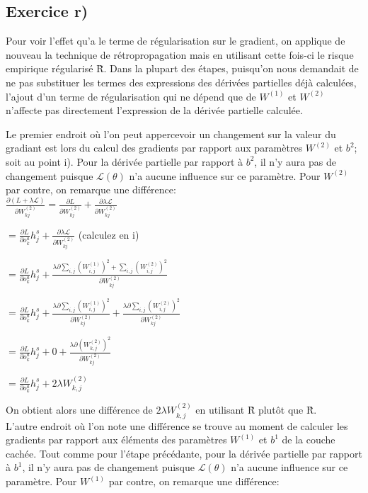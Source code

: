 \documentclass[a4paper,10pt]{article}
\begin{document}
\subsection{Exercice r)}

Pour voir l'effet qu'a le terme de régularisation sur le gradient, on applique de nouveau la technique de rétropropagation mais en utilisant cette fois-ci le risque empirique régularisé \~{R}. Dans la plupart des étapes, puisqu'on nous demandait de ne pas substituer les termes des expressions des dérivées partielles déjà calculées, l'ajout d'un terme de régularisation qui ne dépend que de $W^{(1)}$ et $W^{(2)}$ n'affecte pas directement l'expression de la dérivée partielle calculée.

Le premier endroit où l'on peut appercevoir un changement sur la valeur du gradiant est lors du calcul des gradients par rapport aux paramètres $W^{(2)}$ et $b^2$; soit au point i). Pour la dérivée partielle par rapport à $b^2$, il n'y aura pas de changement puisque $\mathcal{L}(\theta)$ n'a aucune influence sur ce paramètre. Pour $W^{(2)}$ par contre, on remarque une différence:\\

$\frac{\partial (L+\lambda \mathcal{L})}{\partial W_{kj}^{(2)}} = \frac{\partial L}{\partial W_{kj}^{(2)}}+\frac{\partial \lambda \mathcal{L}}{\partial W_{kj}^{(2)}}$

$= \frac{\partial L}{\partial o_{k}^a} h_j^s+\frac{\partial \lambda \mathcal{L}}{\partial W_{kj}^{(2)}}$ (calculez en i)

$= \frac{\partial L}{\partial o_{k}^a} h_j^s+\frac{\lambda \partial \sum_{i,j} (W_{i,j}^{(1)})^2 + \sum_{i,j} (W_{i,j}^{(2)})^2}{\partial W_{kj}^{(2)}}$

$= \frac{\partial L}{\partial o_{k}^a} h_j^s+\frac{\lambda \partial \sum_{i,j} (W_{i,j}^{(1)})^2}{\partial W_{kj}^{(2)}}+\frac{\lambda \partial \sum_{i,j} (W_{i,j}^{(2)})^2}{\partial W_{kj}^{(2)}}$

$= \frac{\partial L}{\partial o_{k}^a} h_j^s+0+\frac{\lambda \partial (W_{k,j}^{(2)})^2}{\partial W_{kj}^{(2)}}$

$= \frac{\partial L}{\partial o_{k}^a} h_j^s+2 \lambda W_{k,j}^{(2)}$


On obtient alors une différence de $2 \lambda W_{k,j}^{(2)}$ en utilisant \~{R} plutôt que \^{R}.\\

L'autre endroit où l'on note une différence se trouve au moment de calculer les gradients par rapport aux éléments des paramètres $W^{(1)}$ et $b^1$ de la couche cachée. Tout comme pour l'étape précédante, pour la dérivée partielle par rapport à $b^1$, il n'y aura pas de changement puisque $\mathcal{L}(\theta)$ n'a aucune influence sur ce paramètre. Pour $W^{(1)}$ par contre, on remarque une différence:\\
\end{document}
